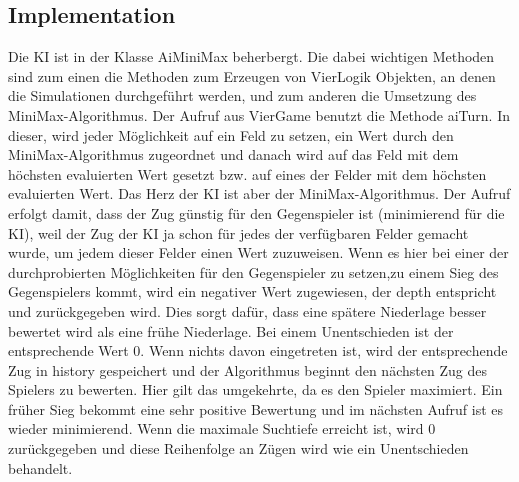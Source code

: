 \documentclass[12pt,a4paper,ngerman]{article}
\begin{document}
	\subsection{Implementation}
	Die KI ist in der Klasse AiMiniMax beherbergt. Die dabei wichtigen Methoden sind zum einen die Methoden zum Erzeugen von VierLogik Objekten, an denen die Simulationen durchgeführt werden, und zum anderen die Umsetzung des MiniMax-Algorithmus. Der Aufruf aus VierGame benutzt die Methode aiTurn. In dieser, wird jeder Möglichkeit auf ein Feld zu setzen, ein Wert durch den MiniMax-Algorithmus zugeordnet und danach wird auf das Feld mit dem höchsten evaluierten Wert gesetzt bzw. auf eines der Felder mit dem höchsten evaluierten Wert. Das Herz der KI ist aber der MiniMax-Algorithmus. Der Aufruf erfolgt damit, dass der Zug günstig für den Gegenspieler ist (minimierend für die KI), weil der Zug der KI ja schon für jedes der verfügbaren Felder gemacht wurde, um jedem dieser Felder einen Wert zuzuweisen. Wenn es hier bei einer der durchprobierten Möglichkeiten für den Gegenspieler zu setzen,zu einem Sieg des Gegenspielers kommt, wird ein negativer Wert zugewiesen, der depth entspricht und zurückgegeben wird. Dies sorgt dafür, dass eine spätere Niederlage besser bewertet wird als eine frühe Niederlage.  Bei einem Unentschieden ist der entsprechende Wert 0. Wenn nichts davon eingetreten ist, wird der entsprechende Zug in history gespeichert und der Algorithmus beginnt den nächsten Zug des Spielers zu bewerten. Hier gilt das umgekehrte, da es den Spieler maximiert. Ein früher Sieg bekommt eine sehr positive Bewertung
	 und im nächsten Aufruf ist es wieder minimierend. Wenn die maximale Suchtiefe erreicht ist, wird 0 zurückgegeben und diese Reihenfolge an Zügen wird wie ein Unentschieden behandelt.
	
\end{document}

